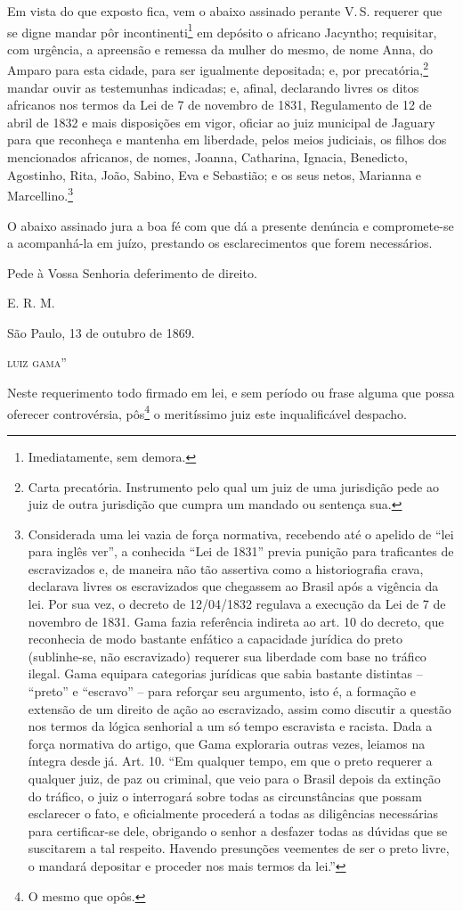 Em vista do que exposto fica, vem o abaixo assinado perante V.\,S.
requerer que se digne mandar pôr incontinenti\footnote{Imediatamente,
  sem demora.} em depósito o africano Jacyntho; requisitar, com
urgência, a apreensão e remessa da mulher do mesmo, de nome Anna, do
Amparo para esta cidade, para ser igualmente depositada; e, por
precatória,\footnote{Carta precatória. Instrumento pelo qual um juiz de
  uma jurisdição pede ao juiz de outra jurisdição que cumpra um mandado
  ou sentença sua.} mandar ouvir as testemunhas indicadas; e, afinal,
declarando livres os ditos africanos nos termos da Lei de 7 de novembro
de 1831, Regulamento de 12 de abril de 1832 e mais disposições em vigor,
oficiar ao juiz municipal de Jaguary para que reconheça e mantenha em
liberdade, pelos meios judiciais, os filhos dos mencionados africanos,
de nomes, Joanna, Catharina, Ignacia, Benedicto, Agostinho, Rita, João,
Sabino, Eva e Sebastião; e os seus netos, Marianna e
Marcellino.\footnote{Considerada uma lei vazia de força normativa,
  recebendo até o apelido de ``lei para inglês ver'', a conhecida ``Lei de
  1831'' previa punição para traficantes de escravizados e, de maneira
  não tão assertiva como a historiografia crava, declarava livres os
  escravizados que chegassem ao Brasil após a vigência da lei. Por sua
  vez, o decreto de 12/04/1832 regulava a execução da Lei de 7 de
  novembro de 1831. Gama fazia referência indireta ao art. 10 do
  decreto, que reconhecia de modo bastante enfático a capacidade
  jurídica do preto (sublinhe-se, não escravizado) requerer sua
  liberdade com base no tráfico ilegal. Gama equipara categorias
  jurídicas que sabia bastante distintas -- ``preto'' e ``escravo'' -- para
  reforçar seu argumento, isto é, a formação e extensão de um direito de
  ação ao escravizado, assim como discutir a questão nos termos da
  lógica senhorial a um só tempo escravista e racista. Dada a força
  normativa do artigo, que Gama exploraria outras vezes, leiamos na
  íntegra desde já. Art. 10. ``Em qualquer tempo, em que o preto requerer
  a qualquer juiz, de paz ou criminal, que veio para o Brasil depois da
  extinção do tráfico, o juiz o interrogará sobre todas as
  circunstâncias que possam esclarecer o fato, e oficialmente procederá
  a todas as diligências necessárias para certificar-se dele, obrigando
  o senhor a desfazer todas as dúvidas que se suscitarem a tal respeito.
  Havendo presunções veementes de ser o preto livre, o mandará depositar
  e proceder nos mais termos da lei.''\label{ingles}}

O abaixo assinado jura a boa fé com que dá a presente denúncia e
compromete-se a acompanhá-la em juízo, prestando os esclarecimentos que
forem necessários.
\begin{flushright}
Pede à Vossa Senhoria deferimento de direito.

E. R. M.

São Paulo, 13 de outubro de 1869.

\textsc{luiz gama}''
\end{flushright}
Neste requerimento todo firmado em lei, e sem período ou frase alguma
que possa oferecer controvérsia, pôs\footnote{O mesmo que opôs.} o
meritíssimo juiz este inqualificável despacho.

